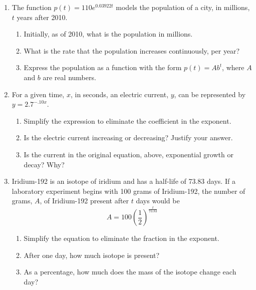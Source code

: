 \documentclass[12pt, oneside]{article}
\begin{document}


\begin{enumerate}


\item The function $p(t)=110e^{0.03922t}$ models the population of a city, in millions, $t$ years after 2010.
\begin{enumerate}
    \item Initially, as of 2010, what is the population in millions.\\[40pt]
    \item What is the rate that the population increases continuously, per year?\\[40pt]
    \item Express the population as a function with the form $p(t)=Ab^{t}$, where $A$ and $b$ are real numbers.\\[40pt]
\end{enumerate}

\item For a given time, $x$, in seconds, an electric current, $y$, can be represented by $y = 2.7^{-.10x}$. 
\begin{enumerate}
    \item Simplify the expression to eliminate the coefficient in the exponent.\\[40pt]
    \item Is the electric current increasing or decreasing? Justify your answer.\\[70pt]
    \item Is the current in the original equation, above, exponential growth or decay? Why?\\[70pt]
\end{enumerate}

\newpage

\item Iridium-192 is an isotope of iridium and has a half-life of 73.83 days. If a laboratory experiment begins with 100 grams of Iridium-192, the number of grams, $A$, of Iridium-192 present after $t$ days would be 
\[A=100 \left( \frac{1}{2} \right)^\frac{t}{73.83}\]

\begin{enumerate}
    \item Simplify the equation to eliminate the fraction in the exponent.\\[30pt]
    \item After one day, how much isotope is present?\\[30pt]
    \item As a percentage, how much does the mass of the isotope change each day?\\[30pt]
\end{enumerate}


\end{enumerate}
\end{document}
